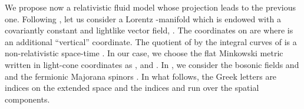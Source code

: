 \documentclass[11pt,a4paper]{article}
\begin{document}
We propose now a relativistic fluid model whose projection leads to the previous one. Following \cite{DBKP}, let us consider a Lorentz \coordHE{}-manifold \coordHE{} which is endowed with a covariantly constant and lightlike vector field, \myHighlight{$\xi$}\coordHE{}. The coordinates on \coordHE{} are \coordHE{} where \coordHE{} is an additional ``vertical'' coordinate. The quotient of \coordHE{} by the integral curves of \myHighlight{$\xi$}\coordHE{} is a \coordHE{} non-relativistic space-time \cite{DBKP}. In our case, we choose the flat Minkowski metric written in light-cone coordinates as \coordHE{}, and \coordHE{}. In \coordHE{}, we consider the bosonic fields \myHighlight{$\rho$}\coordHE{} and \myHighlight{$\theta$}\coordHE{} and the fermionic Majorana spinors \myHighlight{$\tilde{\psi}$}\coordHE{}. In what follows, the Greek letters \coordHE{} are indices on the extended space and the indices \coordHE{} and \coordHE{} run over the spatial components. 
\end{document}
